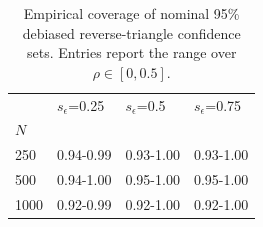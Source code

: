 \begin{table}
\caption{Empirical coverage of nominal 95\% debiased reverse-triangle confidence sets. Entries report the range over $\rho \in [0, 0.5]$.}
\label{tab:synthetic_reverse_triangle_coverage}
\begin{tabular}{llll}
\toprule
 & $s_\epsilon$=0.25 & $s_\epsilon$=0.5 & $s_\epsilon$=0.75 \\
$N$ &  &  &  \\
\midrule
250 & 0.94-0.99 & 0.93-1.00 & 0.93-1.00 \\
500 & 0.94-1.00 & 0.95-1.00 & 0.95-1.00 \\
1000 & 0.92-0.99 & 0.92-1.00 & 0.92-1.00 \\
\bottomrule
\end{tabular}
\end{table}
